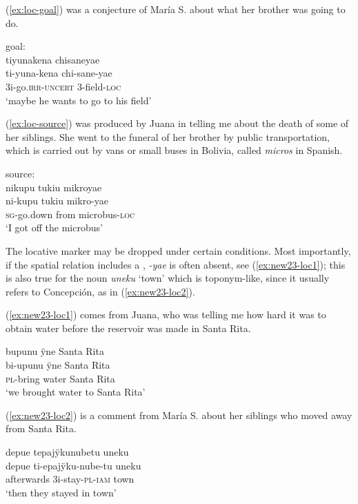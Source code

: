 (\ref{ex:loc-goal}) was a conjecture of María S. about what her brother was going to do.

\ea\label{ex:loc-goal}
\begingl
\glpreamble \textup{goal:}\\tiyunakena chisaneyae\\
\gla ti-yuna-kena chi-sane-yae\\ 
\glb 3i-go.\textsc{irr}-\textsc{uncert} 3-field-\textsc{loc}\\ 
\glft ‘maybe he wants to go to his field’
\trailingcitation{[rxx-e120511l.348]}
\xe

(\ref{ex:loc-source}) was produced by Juana in telling me about the death of some of her siblings. She went to the funeral of her brother by public transportation, which is carried out by vans or small buses in Bolivia, called \textit{micros} in Spanish.

\ea\label{ex:loc-source}
\begingl
\glpreamble \textup{source:}\\nikupu tukiu mikroyae\\
\gla ni-kupu tukiu mikro-yae\\
\textsc{sg}-go.down from microbus-\textsc{loc}\\
\glft ‘I got off the microbus’
\endgl
\trailingcitation{[jxx-p120430l-2.465]}
\xe

The locative marker may be dropped under certain conditions. Most importantly, if the spatial relation includes a , \textit{-yae} is often absent, see (\ref{ex:new23-loc1}); this is also true for the noun \textit{uneku} ‘town’ which is toponym-like, since it usually refers to Concepción, as in (\ref{ex:new23-loc2}).

(\ref{ex:new23-loc1}) comes from Juana, who was telling me how hard it was to obtain water before the reservoir was made in Santa Rita.

\ea\label{ex:new23-loc1}
\begingl
\glpreamble bupunu ÿne Santa Rita\\
\gla bi-upunu ÿne {Santa Rita}\\
\textsc{pl}-bring water {Santa Rita}\\
\glft ‘we brought water to Santa Rita’
\endgl
\trailingcitation{[jxx-p120515l-2.054]}
\xe

(\ref{ex:new23-loc2}) is a comment from María S. about her siblings who moved away from Santa Rita.

\ea\label{ex:new23-loc2}
\begingl
\glpreamble depue tepajÿkunubetu uneku\\
\gla depue ti-epajÿku-nube-tu uneku\\
\glb afterwards 3i-stay-\textsc{pl}-\textsc{iam} town\\
\glft ‘then they stayed in town’
\endgl
\trailingcitation{[rxx-p181101l-2.264]}
\xe

